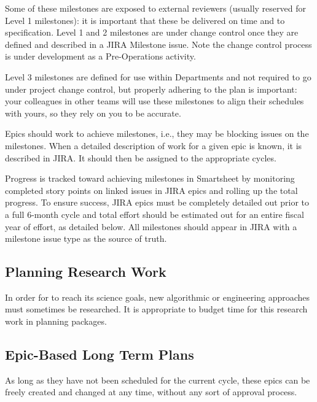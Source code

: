 Some of these milestones are exposed to external reviewers (usually reserved for Level 1 milestones): it is important that these be delivered on time and to specification.
Level 1 and 2 milestones are under change control once they are defined and described in a \gls{JIRA} Milestone issue. Note the change control process is under development as a Pre-Operations activity. 

Level 3 milestones are defined for use within Departments and not required to go under project change control, but properly adhering to the plan is important: your colleagues in other teams will use these milestones to align their schedules with yours, so they rely on you to be accurate.

Epics should work to achieve milestones, i.e., they may be blocking issues on the milestones.
When a detailed description of work for a given \gls{epic} is known, it is described in \gls{JIRA}.
It should then be assigned to the appropriate \glspl{cycle}.

Progress is tracked toward achieving milestones in Smartsheet by monitoring completed story points on linked issues in \gls{JIRA} epics and rolling up the total progress.
To ensure success, \gls{JIRA} epics must be completely detailed out prior to a full 6-month cycle and total effort should be estimated out for an entire fiscal year of effort, as detailed below.
All milestones should appear in \gls{JIRA} with a milestone issue type as the source of truth. 

\subsection{Planning Research Work}
\label{sec:long-term-research}

In order for \RO  to reach its science goals, new algorithmic or engineering approaches must sometimes be researched.
It is appropriate to budget time for this research work in planning packages.

\subsection{Epic-Based Long Term Plans}

As long as they have not been scheduled for the current \gls{cycle}, these \glspl{epic} can be freely created and changed at any time, without any sort of approval process.

